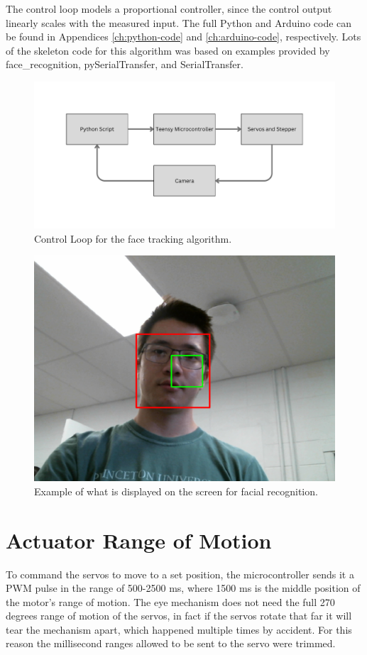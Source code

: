 The control loop models a proportional controller, since the control output linearly scales with the measured input. The full Python and Arduino code can be found in Appendices \ref{ch:python-code} and \ref{ch:arduino-code}, respectively. Lots of the skeleton code for this algorithm was based on examples provided by face\_recognition, pySerialTransfer, and SerialTransfer.

\begin{figure}[h]
    \centering
    \includegraphics[width=0.9\linewidth]{Thesis/ch4/Microcontroller (3).pdf}
    \caption{Control Loop for the face tracking algorithm.}
    \label{fig:control_loop}
\end{figure}

\begin{figure}
    \centering
    \includegraphics[width=0.5\linewidth]{Thesis/ch4/face-example.png}
    \caption{Example of what is displayed on the screen for facial recognition.}
    \label{fig:face-example}
\end{figure}

\section{Actuator Range of Motion}
\label{ch:safety}
To command the servos to move to a set position, the microcontroller sends it a PWM pulse in the range of 500-2500 ms, where 1500 ms is the middle position of the motor's range of motion. The eye mechanism does not need the full 270 degrees range of motion of the servos, in fact if the servos rotate that far it will tear the mechanism apart, which happened multiple times by accident. For this reason the millisecond ranges allowed to be sent to the servo were trimmed. 


